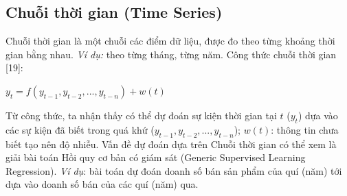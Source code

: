 \documentclass[12pt]{extarticle}
\begin{document}
		\subsection{Chuỗi thời gian (Time Series)}
			\par Chuỗi thời gian là một chuỗi các điểm dữ liệu, được đo theo từng khoảng thời gian bằng nhau. \textit{Ví dụ:} theo từng tháng, từng năm. Công thức chuỗi thời gian [19]:
			\begin{center}
				$y_{t}=f(y_{t-1},y_{t-2},...,y_{t-n}) + w(t)$
			\end{center}
			\par Từ công thức, ta nhận thấy có thể dự đoán sự kiện thời gian tại $t$ ($y_{t}$) dựa vào các sự kiện đã biết trong quá khứ ($y_{t-1},y_{t-2},...,y_{t-n}$); $w(t)$: thông tin chưa biết tạo nên độ nhiễu. Vấn đề dự đoán dựa trên Chuỗi thời gian có thể xem là giải bài toán Hồi quy cơ bản có giám sát (Generic Supervised Learning Regression). \textit{Ví dụ}: bài toán dự đoán doanh số bán sản phẩm của quí (năm) tới dựa vào doanh số bán của các quí (năm) qua.
\end{document}
